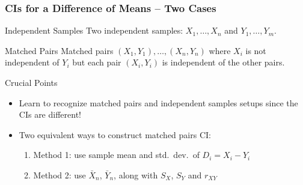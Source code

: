 \begin{frame}
\frametitle{CIs for a Difference of Means -- Two Cases}

\begin{block}{Independent Samples}
 Two independent samples: $X_1, \dots, X_n$ and $Y_1, \dots, Y_m$. 
\end{block}

\begin{block}{Matched Pairs}
 Matched pairs $(X_1, Y_1), \dots, (X_n, Y_n)$ where $X_i$ is \alert{not independent} of $Y_i$ but each pair $(X_i, Y_i)$ is independent of the other pairs. 
\end{block}

\begin{alertblock}{Crucial Points}
\begin{itemize}
	\item Learn to recognize matched pairs and independent samples setups since the CIs are different! 
	\item Two equivalent ways to construct matched pairs CI:
		\begin{enumerate}
			\item Method 1: use sample mean and std.\ dev.\ of $D_i = X_i - Y_i$ 
      \item Method 2: use $\bar{X}_n$, $\bar{Y}_n$, along with $S_X$, $S_Y$ and $r_{XY}$
		\end{enumerate}
\end{itemize}
\end{alertblock}

\end{frame}

